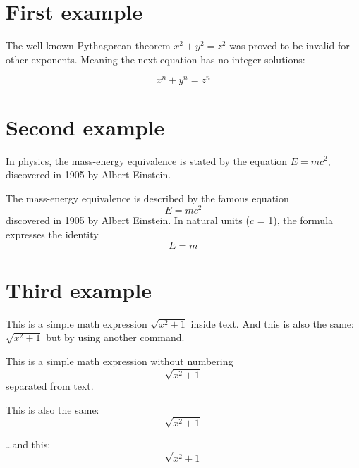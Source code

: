 \documentclass{article}
\begin{document}
\section{First example}

The well known Pythagorean theorem \(x^2 + y^2 = z^2\) was 
proved to be invalid for other exponents. 
Meaning the next equation has no integer solutions:

\[ x^n + y^n = z^n \]



\section{Second example}

In physics, the mass-energy equivalence is stated by the equation $E=mc^2$, discovered in 1905 by Albert Einstein.

The mass-energy equivalence is described by the famous equation
\[ E=mc^2 \]
discovered in 1905 by Albert Einstein. 
In natural units ($c$ = 1), the formula expresses the identity
\begin{equation}
E=m
\end{equation}

\section{Third example}

This is a simple math expression \(\sqrt{x^2+1}\) inside text. 
And this is also the same: 
\begin{math}
\sqrt{x^2+1}
\end{math}
but by using another command.

This is a simple math expression without numbering
\[\sqrt{x^2+1}\] 
separated from text.

This is also the same:
\begin{displaymath}
\sqrt{x^2+1}
\end{displaymath}

\ldots and this:
\begin{equation*}
\sqrt{x^2+1}
\end{equation*}
\end{document}
